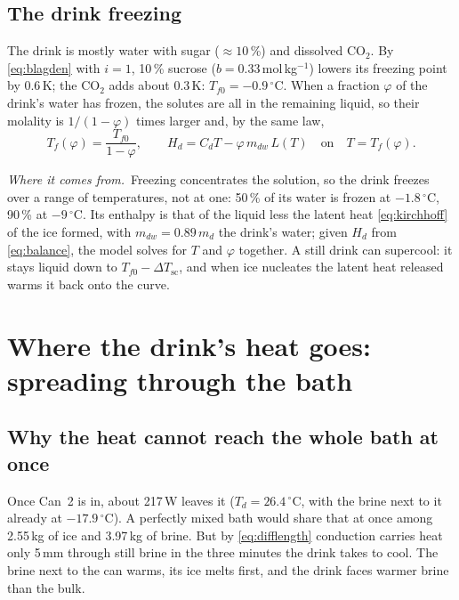 \documentclass[11pt,a4paper]{article}
\newcommand{\dC}{\,^{\circ}\mathrm{C}}
\newcommand{\where}{\par\noindent\textit{Where it comes from.}\ }
\begin{document}
\subsection{The drink freezing}
\label{sec:drinkfreeze}
The drink is mostly water with sugar ($\approx 10$\,\%) and dissolved CO$_2$. By \eqref{eq:blagden}
with $i = 1$, 10\,\% sucrose ($b = 0.33$\,mol\,kg$^{-1}$) lowers its freezing point by 0.6\,K; the CO$_2$
adds about 0.3\,K: $T_{f0} = -0.9\dC$. When a fraction $\varphi$ of the drink's water has frozen, the
solutes are all in the remaining liquid, so their molality is $1/(1-\varphi)$ times larger and, by the
same law,
\begin{equation}
T_f(\varphi) = \frac{T_{f0}}{1 - \varphi},\qquad
H_d = C_d T - \varphi\,m_{dw}\,L(T)\quad\text{on}\quad T = T_f(\varphi).
\label{eq:drinkfreeze}
\end{equation}
\where Freezing concentrates the solution, so the drink freezes over a range of temperatures, not at
one: 50\,\% of its water is frozen at $-1.8\dC$, 90\,\% at $-9\dC$. Its enthalpy is that of the liquid
less the latent heat \eqref{eq:kirchhoff} of the ice formed, with $m_{dw} = 0.89\,m_d$ the drink's water;
given $H_d$ from \eqref{eq:balance}, the model solves for $T$ and $\varphi$ together. A still drink can
supercool: it stays liquid down to $T_{f0} - \Delta T_{\text{sc}}$, and when ice nucleates the latent
heat released warms it back onto the curve.

\section{Where the drink's heat goes: spreading through the bath}
\label{sec:spreading}

\subsection{Why the heat cannot reach the whole bath at once}
Once Can~2 is in, about 217\,W leaves it ($T_d = 26.4\dC$, with the brine next to it already at
$-17.9\dC$). A perfectly mixed bath would share that at once among 2.55\,kg of ice and 3.97\,kg of
brine. But by \eqref{eq:difflength} conduction carries heat only 5\,mm through still brine in the three
minutes the drink takes to cool. The brine next to the can warms, its ice melts first, and the drink
faces warmer brine than the bulk.
\end{document}
